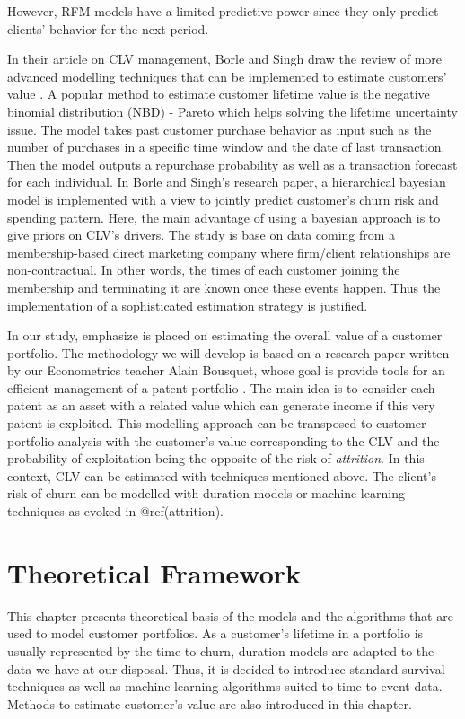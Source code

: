 \documentclass[
]{book}
\begin{document}
However, RFM models have a limited predictive power since they only predict clients' behavior for the next period.

In their article on CLV management, Borle and Singh draw the review of more advanced modelling techniques that can be implemented to estimate customers' value \citep{CLV_MEASUREMENT}. A popular method to estimate customer lifetime value is the negative binomial distribution (NBD) - Pareto \citep{CLV_NBD} which helps solving the lifetime uncertainty issue. The model takes past customer purchase behavior as input such as the number of purchases in a specific time window and the date of last transaction. Then the model outputs a repurchase probability as well as a transaction forecast for each individual. In Borle and Singh's research paper, a hierarchical bayesian model is implemented with a view to jointly predict customer's churn risk and spending pattern. Here, the main advantage of using a bayesian approach is to give priors on CLV's drivers. The study is base on data coming from a membership-based direct marketing company where firm/client relationships are non-contractual. In other words, the times of each customer joining the membership and terminating it are known once these events happen. Thus the implementation of a sophisticated estimation strategy is justified.

In our study, emphasize is placed on estimating the overall value of a customer portfolio. The methodology we will develop is based on a research paper written by our Econometrics teacher Alain Bousquet, whose goal is provide tools for an efficient management of a patent portfolio \citep{BREVETS}. The main idea is to consider each patent as an asset with a related value which can generate income if this very patent is exploited. This modelling approach can be transposed to customer portfolio analysis with the customer's value corresponding to the CLV and the probability of exploitation being the opposite of the risk of \emph{attrition}. In this context, CLV can be estimated with techniques mentioned above. The client's risk of churn can be modelled with duration models or machine learning techniques as evoked in @ref(attrition).

\hypertarget{framework}{%
\chapter{Theoretical Framework}\label{framework}}

This chapter presents theoretical basis of the models and the algorithms that are used to model customer portfolios. As a customer's lifetime in a portfolio is usually represented by the time to churn, duration models are adapted to the data we have at our disposal. Thus, it is decided to introduce standard survival techniques as well as machine learning algorithms suited to time-to-event data. Methods to estimate customer's value are also introduced in this chapter.
\end{document}
